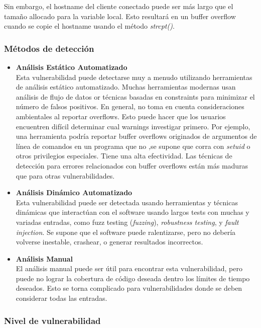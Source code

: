 Sin embargo, el hostname del cliente conectado puede ser más largo que el tamaño allocado para la variable local. Esto resultará en un buffer overflow cuando se copie
el hostname usando el método \textit{strcpt()}.

\subsubsection{Métodos de detección}

\begin{itemize}
    \item \textbf{Análisis Estático Automatizado}\\
        Esta vulnerabilidad puede detectarse muy a menudo utilizando herramientas de análisis estático automatizado. Muchas herramientas modernas usan análisis de flujo de datos
        or técnicas basadas en constraints para minimizar el número de falsos positivos. En general, no toma en cuenta consideraciones ambientales al reportar overflows. Esto puede
        hacer que los usuarios encuentren difícil determinar cual warnings investigar primero. Por ejemplo, una herramienta podría reportar buffer overflows originados de argumentos
        de línea de comandos en un programa que no ,se supone que corra con \textit{setuid} o otros privilegios especiales.
        Tiene una alta efectividad. Las técnicas de detección para errores relacionados con buffer overflows están más maduras que para otras vulnerabilidades.
    \item \textbf{Análisis Dinámico Automatizado}\\
        Esta vulnerabilidad puede ser detectada usando herramientas y técnicas dinámicas que interactúan con el software usando largos tests con muchas y variadas entradas, como
        fuzz testing (\textit{fuzzing}), \textit{robustness testing}, y \textit{fault injection}. Se supone que el software puede ralentizarse, pero no debería volverse inestable,
        crashear, o generar resultados incorrectos.
    \item \textbf{Análisis Manual}\\
        El análisis manual puede ser útil para encontrar esta vulnerabilidad, pero puede no lograr la cobertura de código deseada dentro los límites de tiempo deseados. Esto se torna
        complicado para vulnerabilidades donde se deben considerar todas las entradas.
\end{itemize}

\subsubsection{Nivel de vulnerabilidad}

